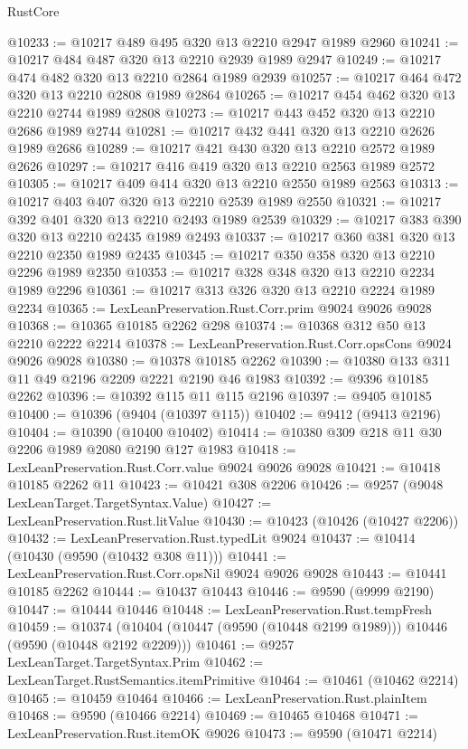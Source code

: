 \begin{lexlean}{RustCore}
\begin{coremodule}
@10233 := @10217 @489 @495 @320 @13 @2210 @2947 @1989 @2960
@10241 := @10217 @484 @487 @320 @13 @2210 @2939 @1989 @2947
@10249 := @10217 @474 @482 @320 @13 @2210 @2864 @1989 @2939
@10257 := @10217 @464 @472 @320 @13 @2210 @2808 @1989 @2864
@10265 := @10217 @454 @462 @320 @13 @2210 @2744 @1989 @2808
@10273 := @10217 @443 @452 @320 @13 @2210 @2686 @1989 @2744
@10281 := @10217 @432 @441 @320 @13 @2210 @2626 @1989 @2686
@10289 := @10217 @421 @430 @320 @13 @2210 @2572 @1989 @2626
@10297 := @10217 @416 @419 @320 @13 @2210 @2563 @1989 @2572
@10305 := @10217 @409 @414 @320 @13 @2210 @2550 @1989 @2563
@10313 := @10217 @403 @407 @320 @13 @2210 @2539 @1989 @2550
@10321 := @10217 @392 @401 @320 @13 @2210 @2493 @1989 @2539
@10329 := @10217 @383 @390 @320 @13 @2210 @2435 @1989 @2493
@10337 := @10217 @360 @381 @320 @13 @2210 @2350 @1989 @2435
@10345 := @10217 @350 @358 @320 @13 @2210 @2296 @1989 @2350
@10353 := @10217 @328 @348 @320 @13 @2210 @2234 @1989 @2296
@10361 := @10217 @313 @326 @320 @13 @2210 @2224 @1989 @2234
@10365 := LexLeanPreservation.Rust.Corr.prim @9024 @9026 @9028
@10368 := @10365 @10185 @2262 @298
@10374 := @10368 @312 @50 @13 @2210 @2222 @2214
@10378 := LexLeanPreservation.Rust.Corr.opsCons @9024 @9026 @9028
@10380 := @10378 @10185 @2262
@10390 := @10380 @133 @311 @11 @49 @2196 @2209 @2221 @2190 @46 @1983
@10392 := @9396 @10185 @2262
@10396 := @10392 @115 @11 @115 @2196
@10397 := @9405 @10185
@10400 := @10396 (@9404 (@10397 @115))
@10402 := @9412 (@9413 @2196)
@10404 := @10390 (@10400 @10402)
@10414 := @10380 @309 @218 @11 @30 @2206 @1989 @2080 @2190 @127 @1983
@10418 := LexLeanPreservation.Rust.Corr.value @9024 @9026 @9028
@10421 := @10418 @10185 @2262 @11
@10423 := @10421 @308 @2206
@10426 := @9257 (@9048 LexLeanTarget.TargetSyntax.Value)
@10427 := LexLeanPreservation.Rust.litValue
@10430 := @10423 (@10426 (@10427 @2206))
@10432 := LexLeanPreservation.Rust.typedLit @9024
@10437 := @10414 (@10430 (@9590 (@10432 @308 @11)))
@10441 := LexLeanPreservation.Rust.Corr.opsNil @9024 @9026 @9028
@10443 := @10441 @10185 @2262
@10444 := @10437 @10443
@10446 := @9590 (@9999 @2190)
@10447 := @10444 @10446
@10448 := LexLeanPreservation.Rust.tempFresh
@10459 := @10374 (@10404 (@10447 (@9590 (@10448 @2199 @1989))) @10446 (@9590 (@10448 @2192 @2209)))
@10461 := @9257 LexLeanTarget.TargetSyntax.Prim
@10462 := LexLeanTarget.RustSemantics.itemPrimitive
@10464 := @10461 (@10462 @2214)
@10465 := @10459 @10464
@10466 := LexLeanPreservation.Rust.plainItem
@10468 := @9590 (@10466 @2214)
@10469 := @10465 @10468
@10471 := LexLeanPreservation.Rust.itemOK @9026
@10473 := @9590 (@10471 @2214)

\end{coremodule}
\end{lexlean}
